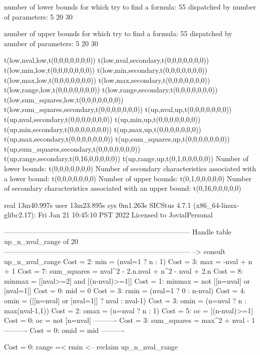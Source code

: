 number of lower bounds for which try to find a formula: 55
dispatched by number of parameters: 5  20  30

number of upper bounds for which try to find a formula: 55
dispatched by number of parameters: 5  20  30

t(low,nval,low,t(0,0,0,0,0,0,0))
t(low,nval,secondary,t(0,0,0,0,0,0,0))
t(low,min,low,t(0,0,0,0,0,0,0))
t(low,min,secondary,t(0,0,0,0,0,0,0))
t(low,max,low,t(0,0,0,0,0,0,0))
t(low,max,secondary,t(0,0,0,0,0,0,0))
t(low,range,low,t(0,0,0,0,0,0,0))
t(low,range,secondary,t(0,0,0,0,0,0,0))
t(low,sum_squares,low,t(0,0,0,0,0,0,0))
t(low,sum_squares,secondary,t(0,0,0,0,0,0,0))
t(up,nval,up,t(0,0,0,0,0,0,0))
t(up,nval,secondary,t(0,0,0,0,0,0,0))
t(up,min,up,t(0,0,0,0,0,0,0))
t(up,min,secondary,t(0,0,0,0,0,0,0))
t(up,max,up,t(0,0,0,0,0,0,0))
t(up,max,secondary,t(0,0,0,0,0,0,0))
t(up,sum_squares,up,t(0,0,0,0,0,0,0))
t(up,sum_squares,secondary,t(0,0,0,0,0,0,0))
t(up,range,secondary,t(0,16,0,0,0,0,0))
t(up,range,up,t(0,1,0,0,0,0,0))
Number of lower bounds:                                             t(0,0,0,0,0,0,0)
Number of secondary characteristics associated with a lower bound:  t(0,0,0,0,0,0,0)
Number of upper bounds:                                             t(0,1,0,0,0,0,0)
Number of secondary characteristics associated with an upper bound: t(0,16,0,0,0,0,0)

real	13m40.997s
user	13m23.895s
sys	0m1.263s
SICStus 4.7.1 (x86_64-linux-glibc2.17): Fri Jan 21 10:45:10 PST 2022
Licensed to JovialPersonal


--------------------------------------------------------------------------------
Handle table up_n_nval_range of 20
--------------------------------------------------------------------------------
--> consult up_n_nval_range
Cost =  2:  min         = (nval=1 ? n : 1)
Cost =  3:  max         = -nval + n + 1
Cost =  7:  sum_squares = nval^2 - 2.n.nval + n^2 - nval + 2.n
Cost =  8:  minmax      = [[nval>=2] and [(n-nval)>=1]]
Cost =  1:  minmax      = not [[n=nval] or [nval=1]]
Cost =  0:  mid         = 0
Cost =  3:  rmin        = (nval=1 ? 0 : n-nval)
Cost =  4:  omin        = ([[n=nval] or [nval=1]] ? nval : nval-1)
Cost =  3:  omin        = (n=nval ? n : max(nval-1,1))
Cost =  2:  omax        = (n=nval ? n : 1)
Cost =  5:  oc          = [(n-nval)>=1]
Cost =  0:  oc          = not [n=nval]
----------
Cost =  3:  sum_squares = max^2 + nval - 1
----------
Cost =  0:  omid        = mid
----------

Cost =  0:  range =< rmin
<-- reclaim up_n_nval_range

